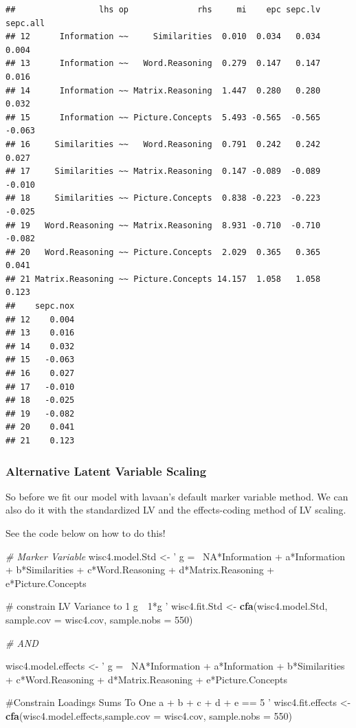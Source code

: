\documentclass[]{book}
\newenvironment{Shaded}{\begin{snugshade}}{\end{snugshade}}
\newcommand{\KeywordTok}[1]{\textcolor[rgb]{0.13,0.29,0.53}{\textbf{#1}}}
\newcommand{\DataTypeTok}[1]{\textcolor[rgb]{0.13,0.29,0.53}{#1}}
\newcommand{\DecValTok}[1]{\textcolor[rgb]{0.00,0.00,0.81}{#1}}
\newcommand{\StringTok}[1]{\textcolor[rgb]{0.31,0.60,0.02}{#1}}
\newcommand{\CommentTok}[1]{\textcolor[rgb]{0.56,0.35,0.01}{\textit{#1}}}
\newcommand{\NormalTok}[1]{#1}
\theoremstyle{definition}
\theoremstyle{definition}
\theoremstyle{definition}
\theoremstyle{remark}
\begin{document}
\begin{verbatim}
##                 lhs op              rhs     mi    epc sepc.lv sepc.all
## 12      Information ~~     Similarities  0.010  0.034   0.034    0.004
## 13      Information ~~   Word.Reasoning  0.279  0.147   0.147    0.016
## 14      Information ~~ Matrix.Reasoning  1.447  0.280   0.280    0.032
## 15      Information ~~ Picture.Concepts  5.493 -0.565  -0.565   -0.063
## 16     Similarities ~~   Word.Reasoning  0.791  0.242   0.242    0.027
## 17     Similarities ~~ Matrix.Reasoning  0.147 -0.089  -0.089   -0.010
## 18     Similarities ~~ Picture.Concepts  0.838 -0.223  -0.223   -0.025
## 19   Word.Reasoning ~~ Matrix.Reasoning  8.931 -0.710  -0.710   -0.082
## 20   Word.Reasoning ~~ Picture.Concepts  2.029  0.365   0.365    0.041
## 21 Matrix.Reasoning ~~ Picture.Concepts 14.157  1.058   1.058    0.123
##    sepc.nox
## 12    0.004
## 13    0.016
## 14    0.032
## 15   -0.063
## 16    0.027
## 17   -0.010
## 18   -0.025
## 19   -0.082
## 20    0.041
## 21    0.123
\end{verbatim}

\subsubsection{Alternative Latent Variable
Scaling}\label{alternative-latent-variable-scaling}

So before we fit our model with lavaan's default marker variable method.
We can also do it with the standardized LV and the effects-coding method
of LV scaling.

See the code below on how to do this!

\begin{Shaded}
\begin{Highlighting}[]
\CommentTok{# Marker Variable }
\NormalTok{wisc4.model.Std <-}\StringTok{ '}
\StringTok{g =~ NA*Information + a*Information + b*Similarities + c*Word.Reasoning + d*Matrix.Reasoning + e*Picture.Concepts}

\StringTok{# constrain LV Variance to 1 }
\StringTok{g~~1*g}
\StringTok{'}
\NormalTok{wisc4.fit.Std <-}\StringTok{ }\KeywordTok{cfa}\NormalTok{(wisc4.model.Std, }\DataTypeTok{sample.cov =}\NormalTok{ wisc4.cov, }\DataTypeTok{sample.nobs =} \DecValTok{550}\NormalTok{)}

\CommentTok{# AND }

\NormalTok{wisc4.model.effects <-}\StringTok{ '}
\StringTok{g =~ NA*Information + a*Information + b*Similarities + c*Word.Reasoning + d*Matrix.Reasoning + e*Picture.Concepts}

\StringTok{#Constrain Loadings Sums To One }
\StringTok{a + b + c + d + e == 5}
\StringTok{'} 
\NormalTok{wisc4.fit.effects <-}\StringTok{ }\KeywordTok{cfa}\NormalTok{(wisc4.model.effects,}\DataTypeTok{sample.cov =}\NormalTok{ wisc4.cov, }\DataTypeTok{sample.nobs =} \DecValTok{550}\NormalTok{)}
\end{Highlighting}
\end{Shaded}
\end{document}
